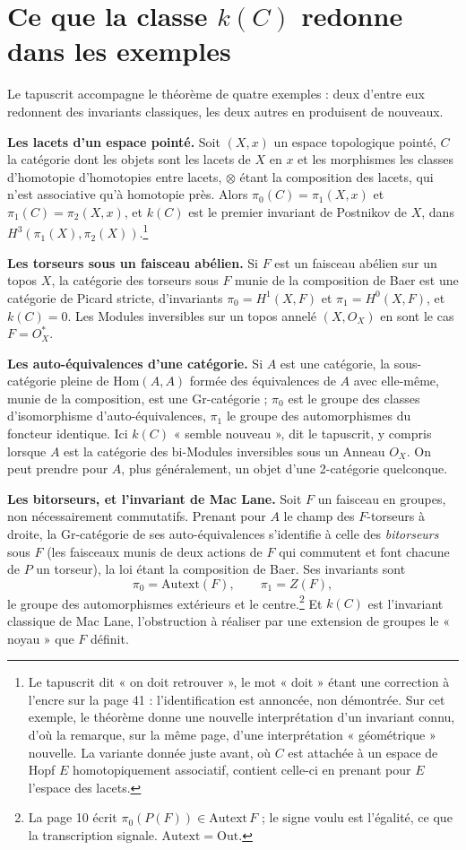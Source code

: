 \documentclass[11pt,a4paper]{article}
\begin{document}
\section*{Ce que la classe $k(C)$ redonne dans les exemples}

Le tapuscrit accompagne le théorème de quatre exemples :
deux d'entre eux redonnent des invariants classiques, les deux
autres en produisent de nouveaux.

\textbf{Les lacets d'un espace pointé.} Soit $(X,x)$ un espace topologique
pointé, $C$ la catégorie dont les objets sont les lacets de $X$ en $x$ et les
morphismes les classes d'homotopie d'homotopies entre lacets, $\otimes$ étant
la composition des lacets, qui n'est associative qu'à homotopie près. Alors $\pi_{0}(C) = \pi_{1}(X,x)$ et $\pi_{1}(C) =
\pi_{2}(X,x)$, et $k(C)$ est le premier invariant de Postnikov de $X$, dans
$H^{3}(\pi_{1}(X), \pi_{2}(X))$.\footnote{Le tapuscrit dit « on doit
retrouver », le mot « doit » étant une correction à l'encre sur la page 41 :
l'identification est annoncée, non démontrée. Sur cet exemple, le théorème donne une
nouvelle interprétation d'un invariant connu, d'où la remarque, sur la même page,
d'une interprétation « géométrique » nouvelle. La variante donnée juste avant,
où $C$ est attachée à un espace de Hopf $E$ homotopiquement associatif,
contient celle-ci en prenant pour $E$ l'espace des lacets.}

\textbf{Les torseurs sous un faisceau abélien.} Si $F$ est un faisceau abélien
sur un topos $X$, la catégorie des torseurs sous $F$ munie de la composition
de Baer est une catégorie de Picard stricte, d'invariants $\pi_{0} =
H^{1}(X,F)$ et $\pi_{1} = H^{0}(X,F)$, et $k(C) = 0$. Les Modules inversibles
sur un topos annelé $(X, O_{X})$ en sont le cas $F = O_{X}^{*}$.

\textbf{Les auto-équivalences d'une catégorie.} Si $A$ est une catégorie, la
sous-catégorie pleine de $\mathrm{Hom}(A,A)$ formée des équivalences de $A$
avec elle-même, munie de la composition, est une Gr-catégorie ; $\pi_{0}$ est
le groupe des classes d'isomorphisme d'auto-équivalences, $\pi_{1}$ le groupe
des automorphismes du foncteur identique. Ici $k(C)$ « semble nouveau », dit
le tapuscrit, y compris lorsque $A$ est la catégorie des bi-Modules
inversibles sous un Anneau $O_{X}$. On peut prendre pour $A$, plus
généralement, un objet d'une 2-catégorie quelconque.

\textbf{Les bitorseurs, et l'invariant de Mac Lane.} Soit $F$ un faisceau en
groupes, non nécessairement commutatifs. Prenant pour $A$ le champ des
$F$-torseurs à droite, la Gr-catégorie de ses auto-équivalences s'identifie à
celle des \emph{bitorseurs} sous $F$ (les faisceaux munis de deux actions de
$F$ qui commutent et font chacune de $P$ un torseur), la loi étant la
composition de Baer. Ses invariants sont
\[
\pi_{0} = \mathrm{Autext}(F), \qquad \pi_{1} = Z(F),
\]
le groupe des automorphismes extérieurs et le centre.\footnote{La page 10
écrit $\pi_{0}(P(F)) \in \mathrm{Autext}\,F$ ; le signe voulu est l'égalité, ce
que la transcription signale. $\mathrm{Autext} = \mathrm{Out}$.} Et $k(C)$ est l'invariant classique de Mac Lane, l'obstruction à réaliser
par une extension de groupes le « noyau » que $F$ définit.
\end{document}
